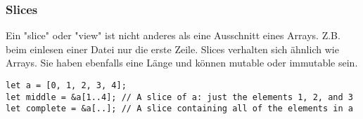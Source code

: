 \subsubsection{Slices}
Ein "slice" oder "view" ist nicht anderes als eine Ausschnitt eines Arrays. Z.B. beim einlesen einer Datei nur die erste Zeile.
Slices verhalten sich ähnlich wie Arrays. Sie haben ebenfalls eine Länge und können mutable oder immutable sein.

\begin{lstlisting}
let a = [0, 1, 2, 3, 4];
let middle = &a[1..4]; // A slice of a: just the elements 1, 2, and 3
let complete = &a[..]; // A slice containing all of the elements in a
\end{lstlisting}